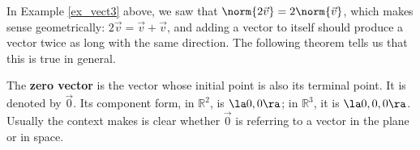 In Example \ref{ex_vect3} above, we saw that $\norm{2\vec v} = 2\norm{\vec v}$, which makes sense geometrically: $2\vec v = \vec v+\vec v$, and adding a vector to itself should produce a vector twice as long with the same direction. The following theorem tells us that this is true in general.





The \textbf{zero vector} is the vector whose initial point is also its terminal point. It is denoted by $\vec 0$. Its component form, in $\mathbb{R}^2$, is $\la 0,0\ra$; in $\mathbb{R}^3$, it is $\la 0,0,0\ra$. Usually the context makes is clear whether $\vec 0$ is referring to a vector in the plane or in space. 

